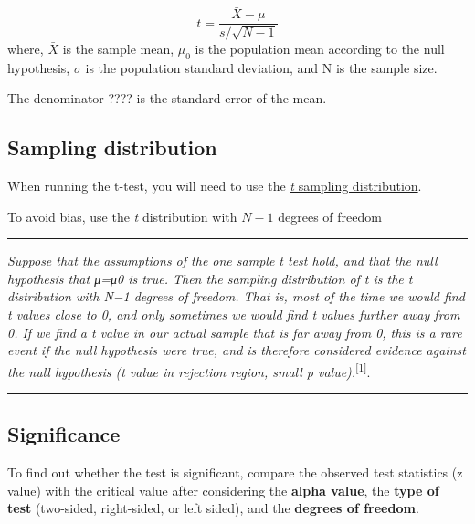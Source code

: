\documentclass[
]{article}
\begin{document}
\[
t = \frac{\bar{X} - \mu}{s/\sqrt{N-1} }
\] where, \(\bar{X}\) is the sample mean, \(\mu_0\) is the population mean according to the null hypothesis, \(\sigma\) is the population standard deviation, and N is the sample size.

The denominator ???? is the standard error of the mean.

\hypertarget{sampling-distribution-1}{%
\subsection{Sampling distribution}\label{sampling-distribution-1}}

When running the t-test, you will need to use the \href{https://statkat.com/sampling-distribution/one-sample-t-test/t.php}{\emph{t} sampling distribution}.

\hfill\break
To avoid bias, use the \emph{t} distribution with \(N-1\) degrees of freedom

\begin{center}\rule{0.5\linewidth}{0.5pt}\end{center}

\emph{Suppose that the assumptions of the one sample t test hold, and that the null hypothesis that μ=μ0 is true. Then the sampling distribution of t is the t distribution with N−1 degrees of freedom. That is, most of the time we would find t values close to 0, and only sometimes we would find t values further away from 0. If we find a t value in our actual sample that is far away from 0, this is a rare event if the null hypothesis were true, and is therefore considered evidence against the null hypothesis (t value in rejection region, small p value).}\textsuperscript{{[}1{]}}.

\begin{center}\rule{0.5\linewidth}{0.5pt}\end{center}

\hypertarget{significance-1}{%
\subsection{Significance}\label{significance-1}}

To find out whether the test is significant, compare the observed test statistics (z value) with the critical value after considering the \textbf{alpha value}, the \textbf{type of test} (two-sided, right-sided, or left sided), and the \textbf{degrees of freedom}.
\end{document}
